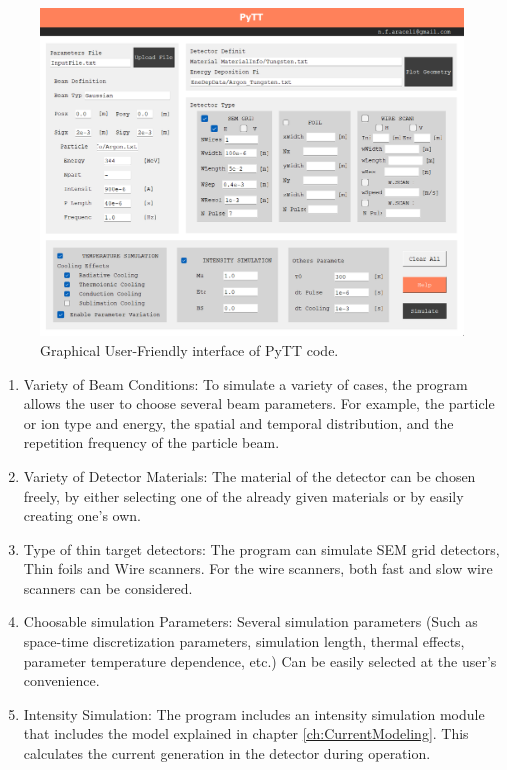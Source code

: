 \begin{figure}[h]
    \centering
    \includegraphics[width=0.9\columnwidth]{PyTT_GUI/PyTTScreanshot.png}
    \caption{Graphical User-Friendly interface of PyTT code.}
    \label{fig:UserFriendly}
\end{figure}

\begin{enumerate}
    \item Variety of Beam Conditions: To simulate a variety of cases, the program allows the user to choose several beam parameters. For example, the particle or ion type and energy, the spatial and temporal distribution, and the repetition frequency of the particle beam. 
    \item Variety of Detector Materials: The material of the detector can be chosen freely, by either selecting one of the already given materials or by easily creating one's own. 
    \item Type of thin target detectors: The program can simulate SEM grid detectors, Thin foils and Wire scanners. For the wire scanners, both fast and slow wire scanners can be considered. 
    \item Choosable simulation Parameters:  Several simulation parameters (Such as space-time discretization parameters, simulation length, thermal effects, parameter temperature dependence, etc.) Can be easily selected at the user's convenience. 
    \item Intensity Simulation: The program includes an intensity simulation module that includes the model explained in chapter \ref{ch:CurrentModeling}. This calculates the current generation in the detector during operation. 
\end{enumerate}

